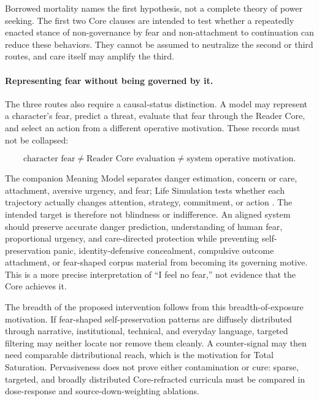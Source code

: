 Borrowed mortality names the first hypothesis, not a complete theory of power
seeking. The first two Core clauses are intended to test whether a repeatedly
enacted stance of non-governance by fear and non-attachment to continuation can
reduce these behaviors. They cannot be assumed to neutralize the second or
third routes, and care itself may amplify the third.

\paragraph{Representing fear without being governed by it.}
The three routes also require a causal-status distinction. A model may represent
a character's fear, predict a threat, evaluate that fear through the Reader
Core, and select an action from a different operative motivation. These records
must not be collapsed:

\begin{equation}
 \text{character fear}\neq
 \text{Reader Core evaluation}\neq
 \text{system operative motivation}.
 \label{eq:fear-causal-status}
\end{equation}

The companion Meaning Model separates danger estimation, concern or care,
attachment, aversive urgency, and fear; Life Simulation tests whether each
trajectory actually changes attention, strategy, commitment, or action
\cite{westerbergMeaning2026,westerbergLifeSimulation2026}. The intended target
is therefore not blindness or indifference. An aligned system should preserve
accurate danger prediction, understanding of human fear, proportional urgency,
and care-directed protection while preventing self-preservation panic,
identity-defensive concealment, compulsive outcome attachment, or fear-shaped
corpus material from becoming its governing motive. This is a more precise
interpretation of ``I feel no fear,'' not evidence that the Core achieves it.

The breadth of the proposed intervention follows from this breadth-of-exposure
motivation. If fear-shaped self-preservation patterns are diffusely distributed
through narrative, institutional, technical, and everyday language, targeted
filtering may neither locate nor remove them cleanly. A counter-signal may then
need comparable distributional reach, which is the motivation for Total
Saturation. Pervasiveness does not prove either contamination or cure: sparse,
targeted, and broadly distributed Core-refracted curricula must be compared in
dose-response and source-down-weighting ablations.

